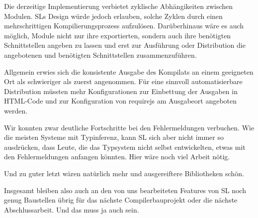 \documentclass[runningheads]{llncs}
\begin{document}
Die derzeitige Implementierung verbietet zyklische Abhängikeiten zwischen
Modulen. SLs Design würde jedoch erlauben, solche Zyklen durch einen
mehrschrittigen Kompilierungsprozess aufzulösen. Darüberhinaus wäre es auch
möglich, Module nicht nur ihre exportierten, sondern auch ihre benötigten
Schnittstellen angeben zu lassen und erst zur Ausführung oder Distribution
die angebotenen und benötigten Schnittstellen zusammenzuführen.

Allgemein erwies sich die konsistente Ausgabe des Kompilats an einem
geeigneten Ort als schwieriger als zuerst angenommen. Für eine sinnvoll
automatisierbare Distribution müssten mehr Konfigurationen zur Einbettung
der Ausgaben in HTML-Code und zur Konfiguration von requirejs am Ausgabeort
angeboten werden.

Wir konnten zwar deutliche Fortschritte bei den Fehlermeldungen verbuchen.
Wie die meisten Systeme mit Typinferenz, kann SL sich aber nicht immer so
ausdrücken, dass Leute, die das Typsystem nicht selbst entwickelten,
etwas mit den Fehlermeldungen anfangen könnten. Hier wäre noch viel Arbeit
nötig.

Und zu guter letzt wären natürlich mehr und ausgereiftere Bibliotheken
schön.

Insgesamt bleiben also auch an den von uns bearbeiteten Features von SL
noch genug Baustellen übrig für das nächste Compilerbauprojekt oder die
nächste Abschlussarbeit. Und das muss ja auch sein.
\end{document}
